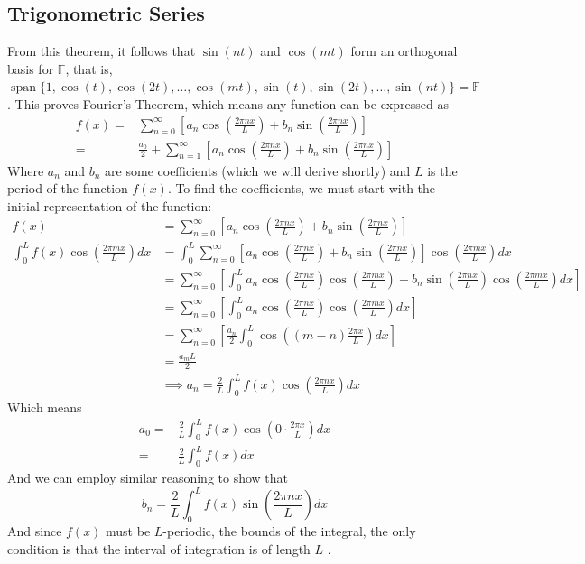 \documentclass[12pt]{article}
\DeclareMathOperator{\spn}{span}
\begin{document}
    \subsection{Trigonometric Series}
    From this theorem, it follows that $\sin(nt)$ and $\cos(mt)$ form an orthogonal basis for $\mathbb{F}$, that is, $\spn{\{1, \cos(t), \cos(2t),\ldots,\cos(mt),\sin(t),\sin(2t),\ldots,\sin(nt)\}} = \mathbb{F}$. This proves Fourier's Theorem, which means any function can be expressed as
    \begin{align}
        f(x) = & \sum_{n=0}^{\infty} \left[ a_n\cos\left(\frac{2\pi n x}{L}\right) + b_n\sin\left( \frac{2\pi n x}{L} \right)\right] \\
        = & \frac{a_0}{2} + \sum_{n=1}^{\infty} \left[ a_n\cos\left(\frac{2\pi n x}{L}\right) + b_n\sin\left( \frac{2\pi n x}{L} \right)\right]
    \end{align}
    Where $a_n$ and $b_n$ are some coefficients (which we will derive shortly) and  $L$ is the period of the function  $f(x)$. To find the coefficients, we must start with the initial representation of the function:
    \begin{align}
        f(x) &= \sum_{n=0}^{\infty}\left[ a_n\cos\left(\frac{2\pi n x }{L}\right) + b_n\sin\left( \frac{2\pi n x}{L} \right)  \right] \\
        \int_0^L f(x) \cos\left( \frac{2\pi m x}{L} \right)dx &= \int_0^L \sum_{n=0}^{\infty} \left[ a_n\cos\left(\frac{2\pi n x}{L}\right) + b_n\sin\left( \frac{2\pi n x}{L} \right)\right] \cos\left(\frac{2\pi m x}{L}\right)dx \\
                                      &= \sum_{n=0}^{\infty} \left[ \int_0^L a_n\cos\left(\frac{2\pi n x}{L}\right)\cos\left(\frac{2\pi m x}{L}\right) + b_n\sin\left( \frac{2\pi n x}{L} \right)\cos\left(\frac{2\pi m x}{L}\right)dx \right] \\
                                      &= \sum_{n=0}^{\infty} \left[ \int_0^L a_n\cos\left(\frac{2\pi n x}{L}\right)\cos\left(\frac{2\pi m x}{L}\right)dx \right] \\
                                      &= \sum_{n=0}^{\infty} \left[ \frac{a_n}{2}\int_0^L \cos\left((m-n)\frac{2\pi x}{L}\right)dx \right] \\ 
                                      &= \frac{a_mL}{2} \\
                                      &\implies a_n = \frac{2}{L}\int_0^L f(x)\cos\left( \frac{2\pi n x}{L} \right)dx
    \end{align}
    Which means
    \begin{align}
        a_0 = & \frac{2}{L}\int_0^Lf(x)\cos\left( 0\cdot\frac{2\pi x}{L} \right)dx \\
        = & \frac{2}{L}\int_0^L f(x)dx
    \end{align}
    And we can employ similar reasoning to show that \[b_n = \frac{2}{L}\int_0^Lf(x)\sin\left( \frac{2\pi n x}{L} \right)dx\] And since $f(x)$ must be $L$-periodic, the bounds of the integral, the only condition is that the interval of integration is of length $L$ \cite{harvard}.
\end{document}
